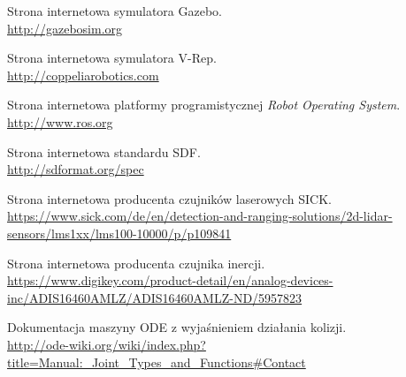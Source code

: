 \begin{thebibliography}{0}
Strona internetowa symulatora Gazebo. \\
\url{http://gazebosim.org}

Strona internetowa symulatora V-Rep. \\
\url{http://coppeliarobotics.com}

Strona internetowa platformy programistycznej \emph{Robot Operating System}. \\
\url{http://www.ros.org}

Strona internetowa standardu SDF. \\
\url{http://sdformat.org/spec}

Strona internetowa producenta czujników laserowych SICK. \\
\url{https://www.sick.com/de/en/detection-and-ranging-solutions/2d-lidar-sensors/lms1xx/lms100-10000/p/p109841}

Strona internetowa producenta czujnika inercji. \\
\url{https://www.digikey.com/product-detail/en/analog-devices-inc/ADIS16460AMLZ/ADIS16460AMLZ-ND/5957823}

Dokumentacja maszyny ODE z wyjaśnieniem działania kolizji. \\
\url{http://ode-wiki.org/wiki/index.php?title=Manual:_Joint_Types_and_Functions#Contact}

\end{thebibliography}

